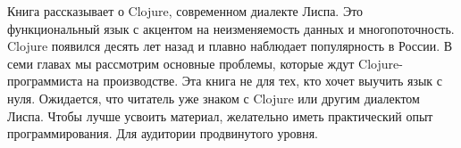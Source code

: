 \thispagestyle{empty}

\small
Книга рассказывает о Clojure, современном диалекте Лиспа. Это функциональный
язык с акцентом на неизменяемость данных и многопоточность. Clojure появился
десять лет назад и плавно наблюдает популярность в России. В семи главах мы
рассмотрим основные проблемы, которые ждут Clojure-программиста на
производстве. Эта книга не для тех, кто хочет выучить язык с нуля. Ожидается,
что читатель уже знаком с Clojure или другим диалектом Лиспа. Чтобы лучше
усвоить материал, желательно иметь практический опыт программирования. Для
аудитории продвинутого уровня.
